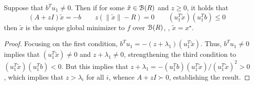 \documentclass[11pt]{article}
\begin{document}
\newcommand{\xopt}{\tilde x}
\begin{cor}\label{cor:optimality-criterion2}
  Suppose that $b^Tu_1 \neq 0$. Then if for some $\xopt \in \B(R)$ and $z \geq 0$, it holds that
  \begin{equation}\label{eqn:pgd-optimality}
  (A + zI)\xopt = -b \qquad z(\|\xopt\| - R) = 0 \qquad (u_1^T \xopt)(u_1^T b) \leq 0 
  \end{equation}
  then $\xopt$ is the unique global minimizer to $f$ over $\mathcal{B}(R)$, \ie, $\xopt = x^\star$. 
\end{cor}
\begin{proof}
  Focusing on the first condition, $b^Tu_1 = -(z + \lambda_1)(u_1^T \xopt)$. Thus,
  $b^T u_1 \neq 0$ implies that $(u_1^T\xopt) \neq 0$ and $z + \lambda_1 \neq 0$,
  strengthening the third condition to $(u_1^T \xopt)(u_1^T b) < 0$. But this implies that
  $z + \lambda_1 = -(u_1^Tb)(u_1^T\xopt)/(u_1^T\xopt)^2> 0$,
  which implies that $z > \lambda_i$ for all $i$, whence $A + zI \succ 0$, establishing the result.
\end{proof}
\end{document}
